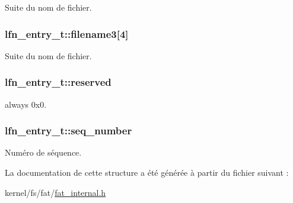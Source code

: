 Suite du nom de fichier. \hypertarget{structlfn__entry__t_aa157718941579c9ef9bb5eba85015ec0}{
\subsubsection[{filename3}]{ lfn\-\_\-entry\-\_\-t\-::filename3\mbox{[}4\mbox{]}}}\label{structlfn__entry__t_aa157718941579c9ef9bb5eba85015ec0}
Suite du nom de fichier. \hypertarget{structlfn__entry__t_a506f9cbd0e4fe209626eedaf48c1f8bf}{
\subsubsection[{reserved}]{ lfn\-\_\-entry\-\_\-t\-::reserved}}\label{structlfn__entry__t_a506f9cbd0e4fe209626eedaf48c1f8bf}
always 0x0. \hypertarget{structlfn__entry__t_a07b88226674917555309538459b194df}{
\subsubsection[{seq\-\_\-number}]{ lfn\-\_\-entry\-\_\-t\-::seq\-\_\-number}}\label{structlfn__entry__t_a07b88226674917555309538459b194df}
Numéro de séquence. 

La documentation de cette structure a été générée à partir du fichier suivant \-:\begin{DoxyCompactItemize}
\item 
kernel/fs/fat/\hyperlink{fat__internal_8h}{fat\-\_\-internal.\-h}\end{DoxyCompactItemize}
